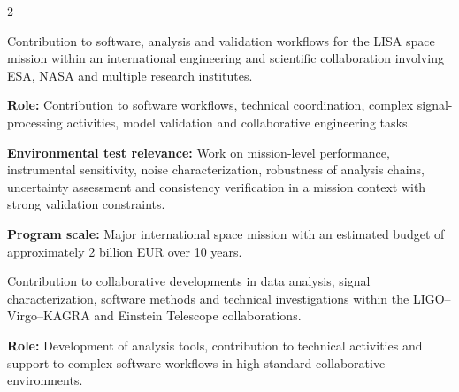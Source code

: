 \documentclass[8pt,a4paper,ragged2e,withhyper]{../_shared/altacv}
\begin{document}
\begin{paracol}{2}
\divider

\divider




\end{paracol}

\newpage



Contribution to software, analysis and validation workflows for the LISA space mission within an international engineering and scientific collaboration involving ESA, NASA and multiple research institutes.

\textbf{Role:} Contribution to software workflows, technical coordination, complex signal-processing activities, model validation and collaborative engineering tasks.

\textbf{Environmental test relevance:} Work on mission-level performance, instrumental sensitivity, noise characterization, robustness of analysis chains, uncertainty assessment and consistency verification in a mission context with strong validation constraints.

\textbf{Program scale:} Major international space mission with an estimated budget of approximately 2 billion EUR over 10 years.

\divider


Contribution to collaborative developments in data analysis, signal characterization, software methods and technical investigations within the LIGO--Virgo--KAGRA and Einstein Telescope collaborations.

\textbf{Role:} Development of analysis tools, contribution to technical activities and support to complex software workflows in high-standard collaborative environments.
\end{document}
